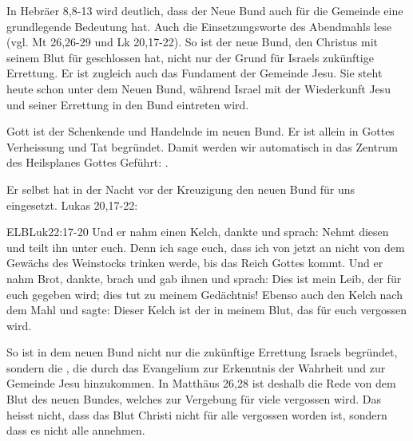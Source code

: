     \begin{otsblock}
        In Hebräer 8,8-13 wird deutlich, dass der Neue Bund auch für die Gemeinde eine grundlegende Bedeutung hat. Auch die Einsetzungsworte des Abendmahls lese (vgl. Mt 26,26-29 und Lk 20,17-22). So ist der neue Bund, den Christus mit seinem Blut für geschlossen hat, nicht nur der Grund für Israels zukünftige Errettung. Er ist zugleich auch das Fundament der Gemeinde Jesu. Sie steht heute schon unter dem Neuen Bund, während Israel mit der Wiederkunft Jesu und seiner Errettung in den Bund eintreten wird.

        Gott ist der Schenkende und Handelnde im neuen Bund. Er ist allein in Gottes Verheissung und Tat begründet. Damit werden wir automatisch in das Zentrum des Heilsplanes Gottes Geführt: .

        Er selbst hat in der Nacht vor der Kreuzigung den neuen Bund für uns eingesetzt. Lukas 20,17-22:
        \begin{bibelbox}{ELB}{Luk}{22:17-20}
            Und er nahm einen Kelch, dankte und sprach: Nehmt diesen und teilt ihn unter euch. Denn ich sage euch, dass ich von jetzt an nicht von dem Gewächs des Weinstocks trinken werde, bis das Reich Gottes kommt. Und er nahm Brot, dankte, brach und gab ihnen und sprach: Dies ist mein Leib, der für euch gegeben wird; dies tut zu meinem Gedächtnis! Ebenso auch den Kelch nach dem Mahl und sagte: Dieser Kelch ist der  in meinem Blut, das für euch vergossen wird.
        \end{bibelbox}
        So ist in dem neuen Bund nicht nur die zukünftige Errettung Israels begründet, sondern die , die durch das Evangelium zur Erkenntnis der Wahrheit und zur Gemeinde Jesu hinzukommen. In Matthäus 26,28 ist deshalb die Rede von dem Blut des neuen Bundes, welches zur Vergebung für viele vergossen wird. Das heisst nicht, dass das Blut Christi nicht für alle vergossen worden ist, sondern dass es nicht alle annehmen.


\end{otsblock}
